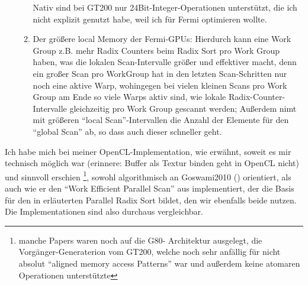 \begin{enumerate}
\begin{enumerate}
			Nativ sind bei GT200 nur 24Bit-Integer-Operationen unterstützt, die ich nicht explizit genutzt habe, weil ich
			für Fermi optimieren wollte.
			\item Der größere local Memory der Fermi-GPUs:
				Hierdurch kann eine Work Group z.B. mehr Radix Counters beim Radix Sort pro Work Group haben, 
				was die lokalen Scan-Intervalle größer und effektiver macht, denn ein großer Scan pro WorkGroup 
				hat in den letzten Scan-Schritten nur noch eine aktive Warp, wohingegen bei vielen kleinen Scans pro Work 					Group am Ende so viele Warps aktiv sind, wie lokale Radix-Counter-Intervalle gleichzeitig pro Work Group 	
				gescannt werden; Außerdem nimt mit größeren "`local Scan"'-Intervallen die Anzahl der Elemente für den
				"`global Scan"' ab, so dass auch dieser schneller geht.
			\end{enumerate}	
	\end{enumerate}
	
	
	


	
	
	Ich habe mich bei meiner OpenCL-Implementation, wie erwähnt, soweit es mir technisch möglich war (erinnere: Buffer als
	Textur binden geht in OpenCL nicht) und sinnvoll erschien
	\footnote{manche Papers waren noch auf die G80- Architektur
		ausgelegt, die Vorgänger-Generaterion vom GT200, welche noch sehr anfällig für nicht absolut 
		"`aligned memory access Patterns"' war und außerdem keine atomaren Operationen unterstützte},
	sowohl algorithmisch an Goswami2010 (\cite{Goswami2010}) orientiert, als auch wie er den 
	"`Work Efficient Parallel Scan"' aus \cite{Harris2007} implementiert, der die Basis für den in \cite{Grand2008} 
	erläuterten Parallel Radix Sort bildet, den wir ebenfalls beide nutzen.
	Die Implementationen sind also durchaus vergleichbar.
	
